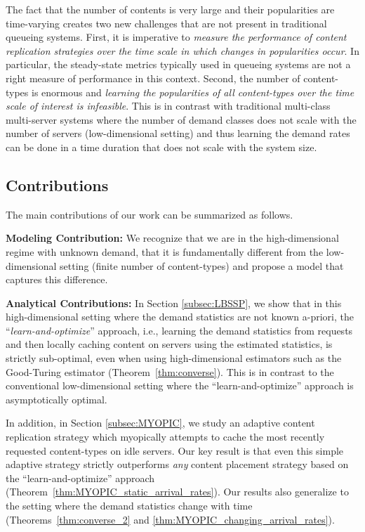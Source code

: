 \documentclass[10pt, conference, letterpaper]{IEEEtran}
\begin{document}
The fact that the number of contents is very large and their
popularities are time-varying creates two new challenges that are not
present in traditional queueing systems. First, it is imperative to
{\em measure the performance of content replication strategies over
	the time scale in which changes in popularities occur}. In
particular, the steady-state metrics typically used in queueing
systems are not a right measure of performance in this context.
Second, the number of content-types is enormous and {\em learning the
	popularities of all content-types over the time scale of interest is
	infeasible}. This is in contrast with traditional multi-class
multi-server systems where the number of demand classes does not scale
with the number of servers (low-dimensional setting) and thus learning
the demand rates can be done in a time duration that does not scale
with the system size.

\subsection{Contributions}

The main contributions of our work can be summarized as follows.

\textbf{Modeling Contribution:} We recognize that we are in the high-dimensional regime with unknown demand, that it is fundamentally different from the low-dimensional setting (finite number of content-types) and propose a model that captures this difference.

\textbf{Analytical Contributions:} In Section \ref{subsec:LBSSP}, we show that in this high-dimensional setting where the demand statistics are not known a-priori, the ``\textit{learn-and-optimize}'' approach, i.e., learning the demand statistics from requests and then locally caching content on
servers using the estimated statistics, is strictly
sub-optimal, even when using high-dimensional estimators such as the
Good-Turing estimator \cite{MS00} (Theorem~\ref{thm:converse}). This is in contrast to the
conventional low-dimensional setting where the ``learn-and-optimize'' approach is asymptotically optimal.

In addition, in Section \ref{subsec:MYOPIC}, we study an adaptive content
replication strategy which myopically attempts to cache the most
recently requested content-types on idle servers. Our key result is
that even this simple adaptive strategy strictly outperforms
\textit{any} content placement strategy based on the
``learn-and-optimize'' approach (Theorem~\ref{thm:MYOPIC_static_arrival_rates}). Our results also generalize to the
setting where the demand statistics change with time (Theorems~\ref{thm:converse_2} and \ref{thm:MYOPIC_changing_arrival_rates}).
\end{document}

